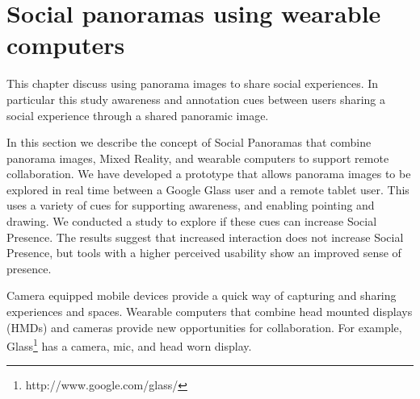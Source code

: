 \section{Social panoramas using wearable computers}

This chapter discuss using panorama images to share social experiences. In particular this study awareness and annotation cues between users sharing a social experience through a shared panoramic image.







In this section we describe the concept of Social Panoramas that combine panorama images, Mixed Reality, and wearable computers to support remote collaboration. We have developed a prototype that allows panorama images to be explored in real time between a Google Glass user and a remote tablet user. This uses a variety of cues for supporting awareness, and enabling pointing and drawing. We conducted a study to explore if these cues can increase Social Presence. The results suggest that increased interaction does not increase Social Presence, but tools with a higher perceived usability show an improved sense of presence.


Camera equipped mobile devices provide a quick way of capturing and sharing experiences and spaces. Wearable
computers that combine head mounted displays (HMDs) and cameras provide new opportunities for collaboration. For example, Glass\footnote{http://www.google.com/glass/} has a camera, mic, and head worn display.

